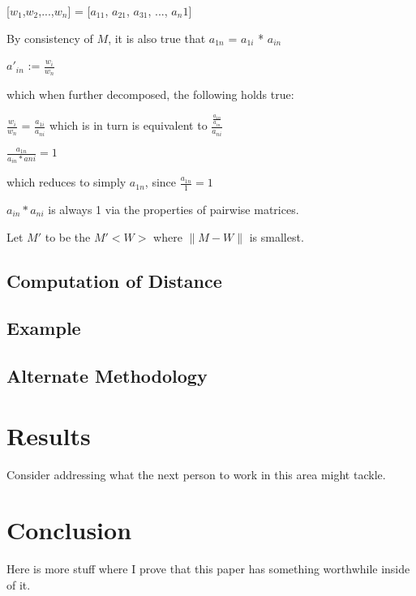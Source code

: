 \documentclass[12pt]{amsart}
\newtheorem{theorem}{Theorem}
\theoremstyle{definition}
\begin{document}
[$w_1$,$w_2$,...,$w_n$] = [$a_{11}$, $a_{21}$, $a_{31}$, ..., $a_n1$]

By consistency of $M$, it is also true that 
$a_{1n}$ = $a_{1i}$ * $a_{in}$

$a'_{in}$ := $\frac{w_i}{w_n}$

which when further decomposed, the following holds true:

$\frac{w_i}{w_n}$ = $\frac{a_{1i}}{a_{ni}}$ which is in turn is equivalent to $\frac{\frac{a_{1n}}{a_{in}}}{a_{ni}}$

$\frac{a_{1n}}{a_{in}*a{ni}} = 1$

which reduces to simply $a_{1n}$, since $\frac{a_{1n}}{1} = 1$

${a_{in}*a_{ni}}$ is always 1 via the properties of pairwise matrices.

Let $M'$ to be the $M'<W>$ where $\|M-W\|$ is smallest.




\subsection{Computation of Distance}

\subsection{Example}

\subsection{Alternate Methodology}
%
%    
%





\section{Results}

Consider addressing what the next person to work in this area might tackle.

\section{Conclusion}

Here is more stuff where I prove that this paper has something worthwhile inside of it.



\end{document}
